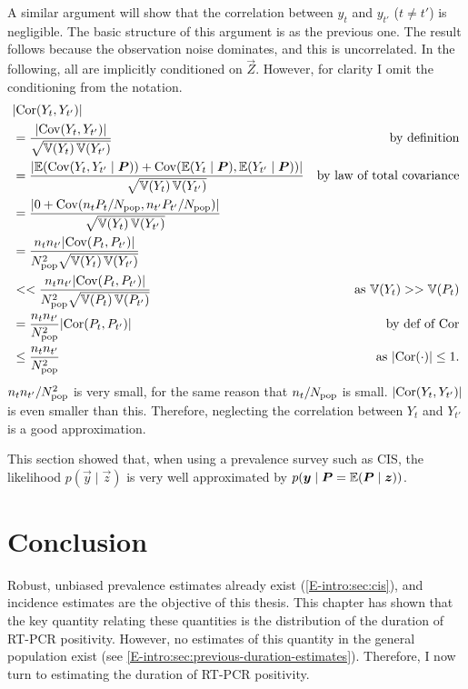 \documentclass[thesis.tex]{subfiles}
\begin{document}
A similar argument will show that the correlation between $y_t$ and $y_{t'}$ ($t \neq t'$) is negligible.
The basic structure of this argument is as the previous one.
The result follows because the observation noise dominates, and this is uncorrelated.
In the following, all are implicitly conditioned on $\vec{Z}$.
However, for clarity I omit the conditioning from the notation.
\begin{align}
  &\lvert \operatorname{Cor}(Y_t, Y_{t'}) \rvert \\
  &= \frac{\lvert\operatorname{Cov}(Y_t, Y_{t'})\rvert}{\sqrt{\operatorname{\mathbb{V}}(Y_t) \operatorname{\mathbb{V}}(Y_{t'})}} &\text{by definition}\\
  &= \frac{\lvert \operatorname{\mathbb{E}}(\operatorname{Cov}(Y_t, Y_{t'} \mid \bm{P})) + \operatorname{Cov}(\operatorname{\mathbb{E}}(Y_t \mid \bm{P}), \operatorname{\mathbb{E}}(Y_{t'} \mid \bm{P})) \rvert}{\sqrt{\operatorname{\mathbb{V}}(Y_t) \operatorname{\mathbb{V}}(Y_{t'})}} &\text{by law of total covariance} \\
  &= \frac{\lvert 0 + \operatorname{Cov}(n_t P_t / N_\text{pop}, n_{t'} P_{t'} / N_\text{pop}) \rvert}{\sqrt{\operatorname{\mathbb{V}}(Y_t) \operatorname{\mathbb{V}}(Y_{t'})}} \\
  &= \frac{n_t n_{t'} \lvert \operatorname{Cov}(P_t, P_{t'}) \rvert}{N_\text{pop}^2 \sqrt{\operatorname{\mathbb{V}}(Y_t) \operatorname{\mathbb{V}}(Y_{t'})}}  \\
  &<< \frac{n_t n_{t'} \lvert \operatorname{Cov}(P_t, P_{t'}) \rvert}{N_\text{pop}^2 \sqrt{\operatorname{\mathbb{V}}(P_t) \operatorname{\mathbb{V}}(P_{t'})}} &\text{as $\operatorname{\mathbb{V}}(Y_t) >> \operatorname{\mathbb{V}}(P_t)$} \\
  &= \frac{n_t n_{t'}}{N_\text{pop}^2} \lvert \operatorname{Cor}(P_t, P_{t'}) \rvert &\text{by def of $\operatorname{Cor}$}\\
  &\leq \frac{n_t n_{t'}}{N_\text{pop}^2} &\text{as $\lvert \operatorname{Cor}(\cdot) \rvert \leq 1$}.
\end{align}
$n_t n_{t'} / N_\text{pop}^2$ is very small, for the same reason that $n_t / N_\text{pop}$ is small.
$\lvert \operatorname{Cor}(Y_t, Y_{t'}) \rvert$ is even smaller than this.
Therefore, neglecting the correlation between $Y_t$ and $Y_{t'}$ is a good approximation.

This section showed that, when using a prevalence survey such as CIS, the likelihood $p(\vec{y} \mid \vec{z})$ is very well approximated by $p(\bm{y} \mid \bm{P} = \operatorname{\mathbb{E}}(\bm{P} \mid \bm{z}))$.


\section{Conclusion} \label{inc-prev:sec:conclusion}

Robust, unbiased prevalence estimates already exist (\cref{E-intro:sec:cis}), and incidence estimates are the objective of this thesis.
This chapter has shown that the key quantity relating these quantities is the distribution of the duration of RT-PCR positivity.
However, no estimates of this quantity in the general population exist (see \cref{E-intro:sec:previous-duration-estimates}).
Therefore, I now turn to estimating the duration of RT-PCR positivity.

\ifSubfilesClassLoaded{
  \listoftodos
}{}
\end{document}
